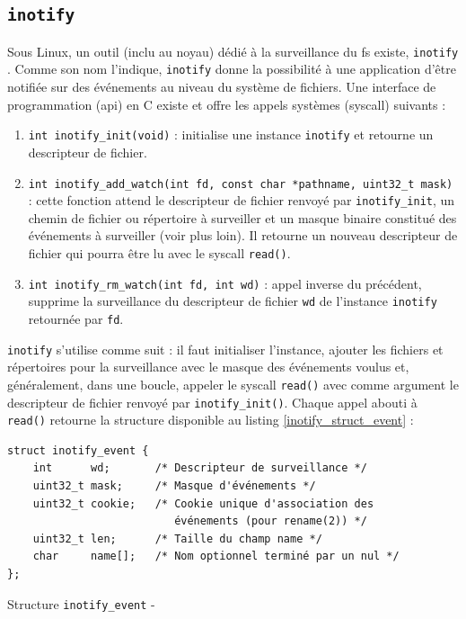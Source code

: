 \subsection{\texttt{inotify}}\label{inotify_techno}
Sous Linux, un outil (inclu au noyau) dédié à la surveillance du \acrshort{fs} existe, \texttt{inotify} 
\cite{ref29}. Comme son nom l'indique, \texttt{inotify} donne la possibilité à une application d'être 
notifiée sur des événements au niveau du système de fichiers. Une interface de programmation (\acrshort{api}) 
en C existe et offre les appels systèmes (\acrshort{syscall}) suivants :
\begin{enumerate}
    \item \texttt{int inotify_init(void)} : initialise une instance \texttt{inotify} et retourne un 
        descripteur de fichier.
    \item \texttt{int inotify_add_watch(int fd, const char *pathname, uint32_t mask)} : 
        cette fonction attend le descripteur de fichier renvoyé par \texttt{inotify_init}, 
        un chemin de fichier ou répertoire à surveiller et un masque binaire constitué des 
        événements à surveiller (voir plus loin). Il retourne un nouveau descripteur de fichier 
        qui pourra être lu avec le \acrshort{syscall} \texttt{read()}.
    \item \texttt{int inotify_rm_watch(int fd, int wd)} : appel inverse du précédent, 
        supprime la surveillance du descripteur de fichier \texttt{wd} de l'instance \texttt{inotify} 
        retournée par \texttt{fd}.
\end{enumerate}
\texttt{inotify} s'utilise comme suit : il faut initialiser l'instance, ajouter les fichiers et répertoires 
pour la surveillance avec le masque des événements voulus et, généralement, dans une boucle, 
appeler le \acrshort{syscall} \texttt{read()} avec comme argument le descripteur de fichier 
renvoyé par \texttt{inotify_init()}. Chaque appel abouti à \texttt{read()} retourne 
la structure disponible au listing \ref{inotify_struct_event} :
\bigbreak
\begin{code}
    \begin{verbatim}
struct inotify_event {
    int      wd;       /* Descripteur de surveillance */
    uint32_t mask;     /* Masque d'événements */
    uint32_t cookie;   /* Cookie unique d'association des
                          événements (pour rename(2)) */
    uint32_t len;      /* Taille du champ name */
    char     name[];   /* Nom optionnel terminé par un nul */
};
    \end{verbatim}
    \caption{Structure \texttt{inotify_event} - \cite{ref29}}
    \label{inotify_struct_event}
\end{code}
